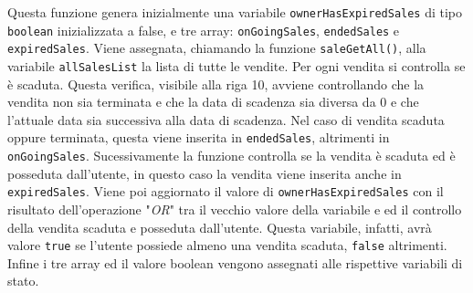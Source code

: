\documentclass[a4paper]{article}
\begin{document}
        Questa funzione genera inizialmente una variabile \verb|ownerHasExpiredSales| di tipo \verb|boolean| inizializzata a false, e tre array: \verb|onGoingSales|, \verb|endedSales| e \verb|expiredSales|.
        Viene assegnata, chiamando la funzione \verb|saleGetAll()|, alla variabile \verb|allSalesList| la lista di tutte le vendite. Per ogni vendita si controlla se è scaduta. Questa verifica, visibile alla riga 10, avviene controllando
        che la vendita non sia terminata e che la data di scadenza sia diversa da 0 e che l'attuale data sia successiva alla data di scadenza. Nel caso di vendita scaduta oppure terminata, questa viene inserita in \verb|endedSales|, altrimenti
        in \verb|onGoingSales|. Sucessivamente la funzione controlla se la vendita è scaduta ed è posseduta dall'utente, in questo caso la vendita viene inserita anche in \verb|expiredSales|. Viene poi aggiornato il valore di \verb|ownerHasExpiredSales|
        con il risultato dell'operazione "\emph{OR}" tra il vecchio valore della variabile e ed il controllo della vendita scaduta e posseduta dall'utente. Questa variabile, infatti, avrà valore \verb|true| se l'utente possiede almeno una vendita scaduta, \verb|false| altrimenti.
        Infine i tre array ed il valore boolean vengono assegnati alle rispettive variabili di stato.
\end{document}
